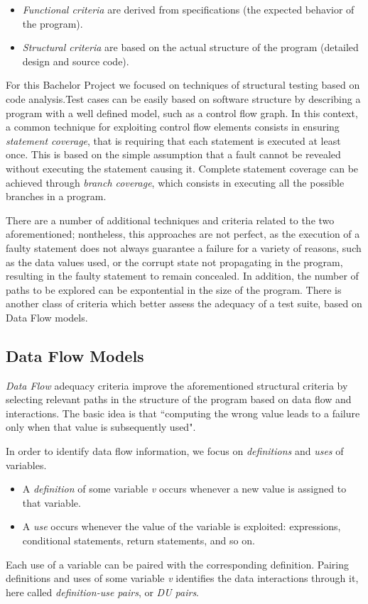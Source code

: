 \begin{itemize}
  \item \textit{Functional criteria} are derived from specifications (the expected behavior of the 
  program).
  \item \textit{Structural criteria} are based on the actual structure of the 
  program (detailed design and source code).
\end{itemize} 
 
For this Bachelor Project we focused on techniques of structural testing based on 
code analysis.Test cases can be easily based on software structure by describing a program
with a well defined model, such as a control flow graph. In this context, a
common technique for exploiting control flow elements consists in ensuring \textit{statement coverage}, 
that is requiring that each statement is executed at least once. This is based on the simple assumption 
that a fault cannot be revealed without executing the statement causing it. 
Complete statement coverage can be achieved through \textit{branch coverage}, 
which consists in executing all the possible branches in a program.

There are a number of additional techniques and criteria related to the two 
aforementioned; nontheless, this approaches are not perfect, as the execution of a faulty 
statement does not always guarantee a failure for a variety of reasons, such as 
the data values used, or the corrupt state not propagating in the program,
resulting in the faulty statement to remain concealed. In addition, the number 
of paths to be explored can be expontential in the size of the program. There 
is another class of criteria which better assess the adequacy of a test suite, 
based on Data Flow models.

\subsection{Data Flow Models}

\textit{Data Flow} adequacy criteria improve the aforementioned structural 
criteria by selecting relevant paths in the structure of the program based on 
data flow and interactions. The basic idea is that ``computing the wrong value leads to a 
failure only when that value is subsequently used". \cite{Pezze2008} 

In order to identify data flow information, we focus on \textit{definitions} and 
\textit{uses} of variables. 

\begin{itemize}
\item A \textit{definition} of some variable \textit{v} occurs
whenever a new value is assigned to that variable.

\item A \textit{use} occurs whenever the value 
of the variable is exploited: expressions, conditional statements, return statements, and so on. 
\end{itemize}
Each use of a variable can be paired with the corresponding definition. 
Pairing definitions and uses of some variable 
\textit{v} identifies the data interactions through it, here called \textit{definition-use pairs}, 
or \textit{DU pairs}.

